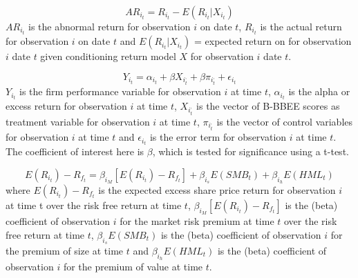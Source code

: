 \begin{equation}
AR_i_t=R_i_t - E(R_i_t|X_i_t)
\end{equation}
$AR_i_t$ is the abnormal return for observation $i$ on date $t$, $R_i_t$ is the actual return for observation $i$ on date $t$ and $E(R_i_t|X_i_t)$ = expected return on for observation $i$ date $t$ given conditioning return model $X$ for observation $i$ date $t$.

\begin{equation}
Y_i_t=\alpha_i_t + \beta X_i_t^{,} + \beta \pi_i_t^{,} + \epsilon_i_t
\end{equation}
$Y_i_t$ is the firm performance variable for observation $i$ at time $t$,
$\alpha_i_t$ is the alpha or excess return for observation $i$ at time $t$, $X_i_t^{,}$ is the vector of B-BBEE scores as treatment variable for observation $i$ at time $t$, $\pi_i_t^{,}$ is the vector of control variables for observation $i$ at time $t$ and $\epsilon_i_t$ is the error term for observation $i$ at time $t$.
The coefficient of interest here is $\beta$, which is tested for significance using a t-test.

\begin{equation}
E(R_i_t) - R_f_t = \beta _i_M[E(R_i_t) - R_f_t] + \beta_i_s E(SMB_t) + \beta_i_h E(HML_t)
\end{equation}
where $E(R_i_t) - R_f_t$
is the expected excess share price return for observation $i$ at time t over the risk free return at time $t$,
$\beta _i_M[E(R_i_t) - R_f_t]$ is the (beta) coefficient of observation $i$ for the market risk premium at time $t$ over the risk free return at time $t$, $\beta_i_s E(SMB_t)$ is the (beta) coefficient of observation $i$  for the premium of size at time $t$ and
$\beta_i_h E(HML_t)$ is the (beta) coefficient of observation $i$  for the premium of value at time $t$.